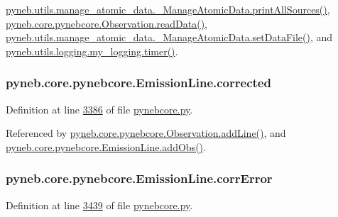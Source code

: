 \hyperlink{manage__atomic__data_8py_source_l00431}{pyneb.\-utils.\-manage\-\_\-atomic\-\_\-data.\-\_\-\-Manage\-Atomic\-Data.\-print\-All\-Sources()}, \hyperlink{pynebcore_8py_source_l03711}{pyneb.\-core.\-pynebcore.\-Observation.\-read\-Data()}, \hyperlink{manage__atomic__data_8py_source_l00380}{pyneb.\-utils.\-manage\-\_\-atomic\-\_\-data.\-\_\-\-Manage\-Atomic\-Data.\-set\-Data\-File()}, and \hyperlink{logging_8py_source_l00115}{pyneb.\-utils.\-logging.\-my\-\_\-logging.\-timer()}.

\hypertarget{classpyneb_1_1core_1_1pynebcore_1_1_emission_line_a5af607e131b5677bff4589562605fe26}{
\subsubsection[{corrected}]{\setlength{\rightskip}{0pt plus 5cm}pyneb.\-core.\-pynebcore.\-Emission\-Line.\-corrected}}\label{classpyneb_1_1core_1_1pynebcore_1_1_emission_line_a5af607e131b5677bff4589562605fe26}


Definition at line \hyperlink{pynebcore_8py_source_l03386}{3386} of file \hyperlink{pynebcore_8py_source}{pynebcore.\-py}.



Referenced by \hyperlink{pynebcore_8py_source_l03558}{pyneb.\-core.\-pynebcore.\-Observation.\-add\-Line()}, and \hyperlink{pynebcore_8py_source_l03469}{pyneb.\-core.\-pynebcore.\-Emission\-Line.\-add\-Obs()}.

\hypertarget{classpyneb_1_1core_1_1pynebcore_1_1_emission_line_adc12988469a310bf5ecaabf299669fc1}{
\subsubsection[{corr\-Error}]{\setlength{\rightskip}{0pt plus 5cm}pyneb.\-core.\-pynebcore.\-Emission\-Line.\-corr\-Error}}\label{classpyneb_1_1core_1_1pynebcore_1_1_emission_line_adc12988469a310bf5ecaabf299669fc1}


Definition at line \hyperlink{pynebcore_8py_source_l03439}{3439} of file \hyperlink{pynebcore_8py_source}{pynebcore.\-py}.



